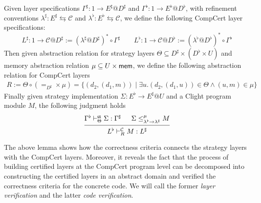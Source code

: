 \documentclass[acmsmall,review,anonymous]{acmart}\settopmatter{printfolios=true,printccs=false,printacmref=false}
\begin{document}
\begin{lemma}
  \label{lemma:relating}
  Given layer specifications
  $\Gamma^\sharp: 1 \rightarrow E^\sharp @D^\sharp$ 
  and $\Gamma^\flat: 1 \rightarrow E^\flat @D^\flat$,
  with refinement conventions
  $\lambda^\sharp: E^\sharp \leftrightarrows \mathcal{C}$
  and $\lambda^\flat: E^\flat \leftrightarrows \mathcal{C}$,
  we define the following CompCert layer specifications:
  \[
    L^\sharp: 1 \rightarrow \mathcal{C}@D^\sharp
    := (\lambda^\sharp @D^\sharp)^* \circ \Gamma^\sharp
    \qquad
    L^\flat: 1 \rightarrow \mathcal{C}@D^\flat
    := (\lambda^\flat @D^\flat)^* \circ \Gamma^\flat
  \]
  Then given
  abstraction relation for strategy layers
  $\Theta \subseteq D^\sharp \times (D^\flat \times U)$
  and memory abstraction relation
  $\mu \subseteq U \times  \mathsf{mem} $,
  we define the following abstraction relation for CompCert layers
  \begin{align*}
    R := \Theta \circ (=_{D^\sharp} \times \mu)
    = \{ (d_2, (d_1, m))
       \mid \exists u. (d_2, (d_1, u)) \in \Theta \wedge (u, m) \in \mu\}
  \end{align*}
  Finally given strategy implementation
  $\Sigma: E^\flat \rightarrow E^\sharp @U$
  and a Clight program module $M$,
  the following judgment holds
  \[
    \begin{prooftree}
      \hypo{\Gamma^\flat \vdash^\kw{st}_\Theta \Sigma : \Gamma^\sharp}
      \hypo{\Sigma \le^\mu_{\lambda^\flat \rightarrow \lambda^\sharp} M}
      \infer2{L^\flat \vdash^\mathcal{C}_R M: L^\sharp}
    \end{prooftree}
  \]
\end{lemma}

The above lemma shows
how the correctness criteria
connects the strategy layers
with the CompCert layers.
Moreover, it reveals the fact
that the process of building certified layers
at the CompCert program level
can be decomposed into
constructing the certified layers in an abstract domain
and verified the correctness criteria
for the concrete code.
We will call the former \emph{layer verification}
and the latter \emph{code verification}.
\end{document}
